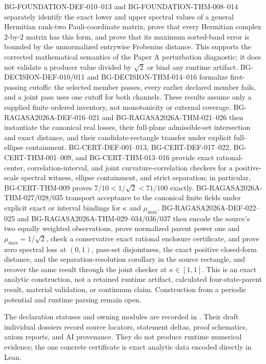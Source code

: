 \documentclass[11pt]{article}
\begin{document}
BG-FOUNDATION-DEF-010--013 and BG-FOUNDATION-THM-008--014 separately identify the
exact lower and upper spectral values of a general Hermitian rank-two Pauli-coordinate
matrix, prove that every Hermitian complex $2$-by-$2$ matrix has this form, and prove that
its maximum sorted-band error is bounded by the unnormalized entrywise Frobenius
distance. This supports the corrected mathematical semantics of the Paper A perturbation
diagnostic; it does not validate a producer value divided by $\sqrt{2}$ or bind any runtime
artifact. BG-DECISION-DEF-010/011 and BG-DECISION-THM-014--016 formalize first-passing
cutoffs: the selected member passes, every earlier declared member fails, and a joint pass
uses one cutoff for both channels. These results assume only a supplied finite ordered
inventory, not monotonicity or external coverage.
BG-RAGASA2026A-DEF-016--021 and BG-RAGASA2026A-THM-021--026 then instantiate the
canonical real losses, their full-plane admissible-set intersection and exact distance,
and their candidate-rectangle transfer under explicit full-ellipse containment.
BG-CERT-DEF-001--013, BG-CERT-DEF-017--022, BG-CERT-THM-001--009, and
BG-CERT-THM-013--016 provide exact rational-center, correlation-interval, and joint
curvature-correlation checkers for a positive-scale spectral witness, ellipse containment,
and strict separation; in particular, BG-CERT-THM-009 proves
$7/10<1/\sqrt{2}<71/100$ exactly. BG-RAGASA2026A-THM-027/028/035 transport acceptance
to the canonical finite fields under explicit exact or interval bindings for $\kappa$ and
$\mu_{\max}$. BG-RAGASA2026A-DEF-022--025 and
BG-RAGASA2026A-THM-029--034/036/037 then encode the source's two equally weighted observations,
prove normalized parent power one and $\mu_{\max}=1/\sqrt{2}$, check a conservative exact
rational enclosure certificate, and prove zero spectral loss at $(0,1)$, pass-set
disjointness, the exact positive closed-form distance, and the separation-resolution
corollary in the source rectangle, and recover the same result through the joint checker at
$\kappa\in[1,1]$. This is an exact analytic construction, not
a retained runtime artifact, calculated four-state-parent result, material validation, or
continuum claim. Construction from a periodic potential and runtime parsing remain open.

The declaration statuses and owning modules are recorded in
. Their draft individual dossiers record source locators, statement deltas, proof
schematics, axiom reports, and AI provenance. They do not produce runtime numerical
evidence; the one concrete certificate is exact analytic data encoded directly in Lean.
\end{document}
